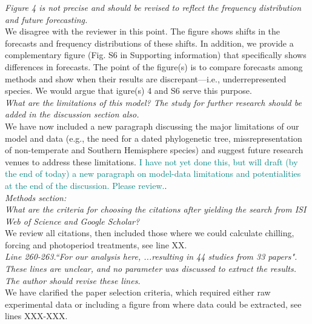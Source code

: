 \documentclass[11pt]{article}
\begin{document}
\emph{Figure 4 is not precise and should be revised to reflect the frequency distribution and future forecasting.}\\
We disagree with the reviewer in this point. The figure shows shifts in the forecasts and frequency distributions of these shifts. In addition, we provide a complementary figure (Fig. S6 in Supporting information) that specifically shows differences in forecasts. The point of the figure(s) is to compare forecasts among methods and show when their results are discrepant---i.e., underrepresented species. We would argue that igure(s) 4 and S6 serve this purpose.\\


\emph{What are the limitations of this model? The study for further research should be added in the discussion section also.}\\
We have now included a new paragraph discussing the major limitations of our model and data (e.g., the need for a dated phylogenetic tree, missrepresentation of non-temperate and Southern Hemisphere species) and suggest future research venues to address these limitations.
\textcolor{teal}{I have not yet done this, but will draft (by the end of today) a new paragraph on model-data limitations and potentialities at the end of the discussion. Please review.}.\\

\emph{Methods section:}\\
\emph{What are the criteria for choosing the citations after yielding the search from ISI Web of Science and Google Scholar?}\\
We review all citations, then included those where we could calculate chilling, forcing and photoperiod treatments, see line XX. \\

\emph{Line 260-263.``For our analysis here, ...resulting in 44 studies from 33 papers". These lines are unclear, and no parameter was discussed to extract the results. The author should revise these lines.}\\
We have clarified the paper selection criteria, which required either raw experimental data or including a figure from where data could be extracted, see lines XXX-XXX. 
\end{document}
